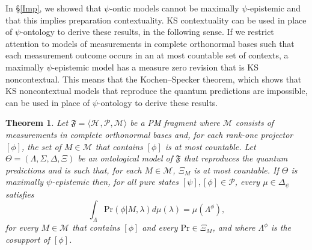 \documentclass[DIV=calc,fontsize=12pt]{scrartcl} %
\theoremstyle{definition}
\theoremstyle{plain}
\newtheorem{theorem}[definition]{Theorem}
\newcommand{\Proj}[1]{\ensuremath{\left [ #1 \right ]}}
\newcommand{\Hilb}[1][]{\ensuremath{\mathcal{H}_{#1}}}
\begin{document}
In \S\ref{Imp}, we showed that $\psi$-ontic models cannot be maximally
$\psi$-epistemic and that this implies preparation contextuality.  KS
contextuality can be used in place of $\psi$-ontology to derive these
results, in the following sense.  If we restrict attention to models
of measurements in complete orthonormal bases such that each
measurement outcome occurs in an at most countable set of contexts, a
maximally $\psi$-epistemic model has a measure zero revision that is KS
noncontextual.  This means that the Kochen--Specker theorem, which
shows that KS noncontextual models that reproduce the quantum
predictions are impossible, can be used in place of $\psi$-ontology to
derive these results.

\begin{theorem}
\label{prop:ME:char}
Let $\mathfrak{F} = \langle \Hilb, \mathcal{P}, \mathcal{M} \rangle$
be a PM fragment where $\mathcal{M}$ consists of measurements in
complete orthonormal bases and, for each rank-one projector
$\Proj{\phi}$, the set of $M \in \mathcal{M}$ that contains
$\Proj{\phi}$ is at most countable.  Let $\Theta = (\Lambda, \Sigma,
\Delta, \Xi)$ be an ontological model of $\mathfrak{F}$ that
reproduces the quantum predictions and is such that, for each $M \in
\mathcal{M}$, $\Xi_M$ is at most countable.  If $\Theta$ is
maximally $\psi$-epistemic then, for all pure states $\Proj{\psi},
\Proj{\phi} \in \mathcal{P}$, every $\mu \in \Delta_{\psi}$
satisfies
\begin{equation}
\label{eq:ME:KS}
\int_{\Lambda} \text{Pr}(\phi|M,\lambda) d \mu(\lambda) =
\mu(\Lambda^{\phi}),
\end{equation}
for every $M \in \mathcal{M}$ that contains $\Proj{\phi}$ and every
$\text{Pr} \in \Xi_M$, and where $\Lambda^{\phi}$ is the cosupport
of $\Proj{\phi}$.
\end{theorem}
\end{document}
